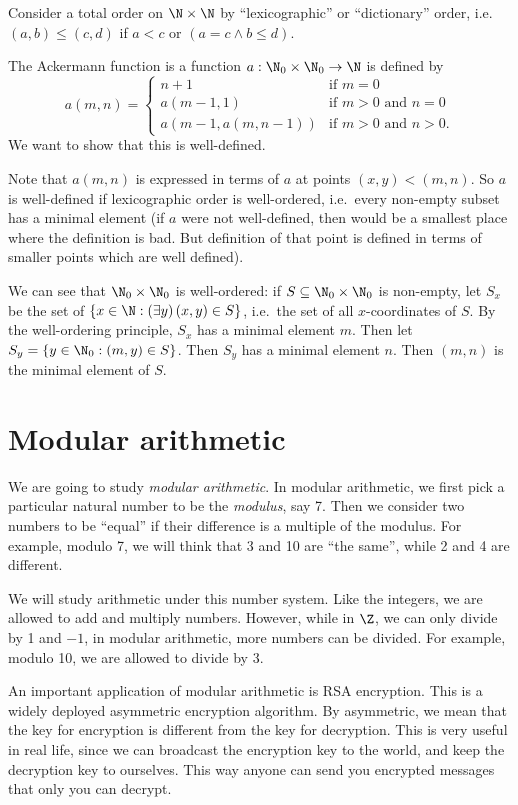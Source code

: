 \documentclass[a4paper]{article}
\begin{document}
\begin{eg}
  Consider a total order on $\N\times \N$ by ``lexicographic'' or ``dictionary'' order, i.e.\ $(a, b) \leq (c, d)$ if $a < c$ or $(a = c\wedge b\leq d)$.

  The Ackermann function is a function $a:\N_0\times \N_0 \to \N$ is defined by
  \[
    a(m, n) =\begin{cases}n+1 & \mbox{if } m = 0 \\a(m-1, 1) & \mbox{if } m > 0 \mbox{ and } n = 0 \\a(m-1, a(m, n-1)) & \mbox{if } m > 0 \mbox{ and } n > 0.\end{cases}
  \]
  We want to show that this is well-defined.

  Note that $a(m, n)$ is expressed in terms of $a$ at points $(x, y) < (m, n)$. So $a$ is well-defined if lexicographic order is well-ordered, i.e.\ every non-empty subset has a minimal element (if $a$ were not well-defined, then would be a smallest place where the definition is bad. But definition of that point is defined in terms of smaller points which are well defined).

  We can see that $\N_0\times \N_0$ is well-ordered: if $S\subseteq \N_0\times \N_0$ is non-empty, let $S_x$ be the set of $\{x\in \N: (\exists y)\,(x, y)\in S\}$, i.e.\ the set of all $x$-coordinates of $S$. By the well-ordering principle, $S_x$ has a minimal element $m$. Then let $S_y = \{y\in \N_0: (m, y)\in S\}$. Then $S_y$ has a minimal element $n$. Then $(m, n)$ is the minimal element of $S$.
\end{eg}

\section{Modular arithmetic}
We are going to study \emph{modular arithmetic}. In modular arithmetic, we first pick a particular natural number to be the \emph{modulus}, say 7. Then we consider two numbers to be ``equal'' if their difference is a multiple of the modulus. For example, modulo 7, we will think that 3 and 10 are ``the same'', while 2 and 4 are different.

We will study arithmetic under this number system. Like the integers, we are allowed to add and multiply numbers. However, while in $\Z$, we can only divide by 1 and $-1$, in modular arithmetic, more numbers can be divided. For example, modulo 10, we are allowed to divide by 3.

An important application of modular arithmetic is RSA encryption. This is a widely deployed asymmetric encryption algorithm. By asymmetric, we mean that the key for encryption is different from the key for decryption. This is very useful in real life, since we can broadcast the encryption key to the world, and keep the decryption key to ourselves. This way anyone can send you encrypted messages that only you can decrypt.
\end{document}

